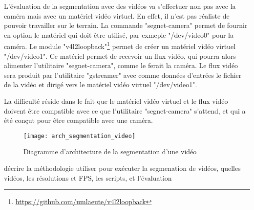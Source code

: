 ﻿
\par L'évaluation de la segmentation avec des vidéos va s'effectuer non pas avec la caméra mais avec un matériel vidéo virtuel. En effet, il n'est pas réaliste de pouvoir travailler sur le terrain. La commande "segnet-camera" permet de fournir en option le matériel qui doit être utilisé, par exmeple "/dev/video0" pour la caméra. Le module "v4l2loopback"\footnote{\url{https://github.com/umlaeute/v4l2loopback}} permet de créer un matériel vidéo virtuel "/dev/video1". Ce matériel permet de recevoir un flux vidéo, qui pourra alors alimenter l'utilitaire "segnet-camera", comme le ferait la caméra. Le flux vidéo sera produit par l'utilitaire "gstreamer" avec comme données d'entrées le fichier de la vidéo et dirigé vers le matériel vidéo virtuel "/dev/video1".
\par La difficulté réside dans le fait que le matériel vidéo virtuel et le flux vidéo doivent être compatible avec ce que l'utilitaire "segnet-camera" s'attend, et qui a été conçut pour être compatible avec une caméra. 
\begin{figure}[H]
    \centering
    \texttt{[image: arch\_segmentation\_video]}
    \caption[Diagramme d'architecture de la segmentation d'une vidéo]{Diagramme d'architecture de la segmentation d'une vidéo}
    \label{fig:arch_segmentation_video}
\end{figure}
{\color{red}décrire la méthodologie utiliser pour exécuter la segmenation de vidéos, quelles vidéos, les résolutions et FPS, les scripts, et l'évaluation}